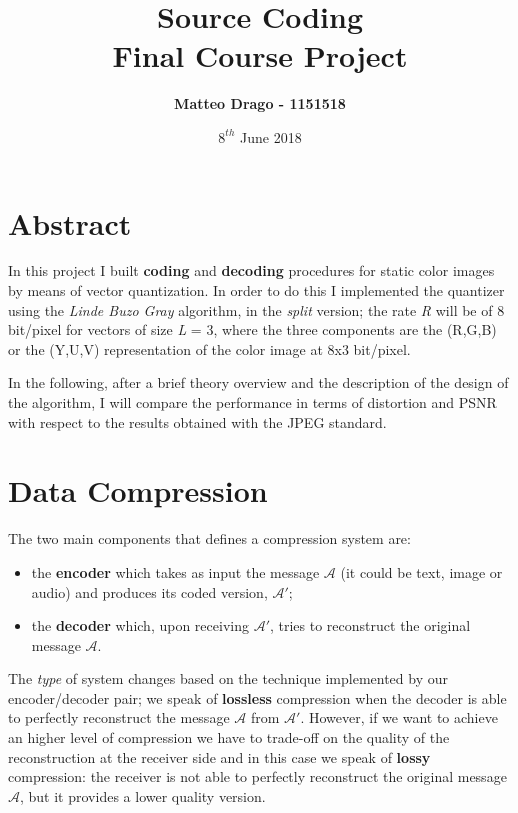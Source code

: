 \documentclass{article}
\newcommand{\hmwkTitle}{Final Course Project} %
\newcommand{\hmwkClass}{Source Coding} %
\newcommand{\hmwkAuthorName}{Matteo Drago - 1151518} %
\begin{document}
\title{
\vspace{2in}
\textmd{\textbf{\hmwkClass \\ \hmwkTitle}}\\
\vspace{3in}
}
\author{\textbf{\hmwkAuthorName}}
\date{$8^{th}$ June 2018} %


\maketitle
{} %
\setcounter{page}{1}

\clearpage 

\section{Abstract}
In this project I built \textbf{coding} and \textbf{decoding} procedures for static color images by means of vector quantization. In order to do this I implemented the quantizer using the \textit{Linde Buzo Gray} algorithm, in the \textit{split} version; the rate \textit{R} will be of 8 bit/pixel for vectors of size \textit{L} = 3, where the three components are the (R,G,B) or the (Y,U,V) representation of the color image at 8x3 bit/pixel.

In the following, after a brief theory overview and the description of the design of the algorithm, I will compare the performance in terms of distortion and PSNR with respect to the results obtained with the JPEG standard.

\section{Data Compression}
The two main components that defines a compression system are:
\begin{itemize}
	\item the \textbf{encoder} which takes as input the message $\mathcal{A}$ (it could be text, image or audio) and produces its coded version, $\mathcal{A}'$;
	\item the \textbf{decoder} which, upon receiving $\mathcal{A}'$, tries to reconstruct the original message $\mathcal{A}$.
\end{itemize}   
The \textit{type} of system changes based on the technique implemented by our encoder/decoder pair; we speak of \textbf{lossless} compression when the decoder is able to perfectly reconstruct the message $\mathcal{A}$ from $\mathcal{A}'$. However, if we want to achieve an higher level of compression we have to trade-off on the quality of the reconstruction at the receiver side and in this case we speak of \textbf{lossy} compression: the receiver is not able to perfectly reconstruct the original message $\mathcal{A}$, but it provides a lower quality version.
\end{document}
